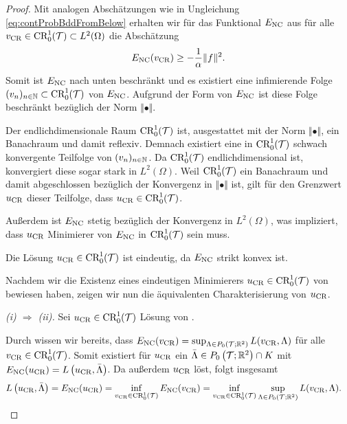 \begin{proof} 
  Mit analogen Abschätzungen wie in Ungleichung \eqref{eq:contProbBddFromBelow}
  erhalten wir für das Funktional $E_\textup{NC}$ aus  
  für alle $v_\textup{CR}\in\textup{CR}^1_0(\mathcal{T})\subset L^2(\Omega)$ die Abschätzung 
  \begin{equation*}
    E_\textup{NC}(v_\textup{CR}) \geq -\frac{1}{\alpha}\Vert f\Vert^2.
  \end{equation*}
  Somit ist $E_\textup{NC}$ nach unten beschränkt und es existiert eine infimierende
  Folge $(v_n)_{n\in\mathbb{N}} \subset \textup{CR}^1_0(\mathcal{T})$ von $E_\textup{NC}$. 
  Aufgrund der Form von $E_\textup{NC}$ ist diese Folge beschränkt bezüglich der Norm
  $\Vert\bullet\Vert$. 

  Der endlichdimensionale Raum $\textup{CR}^1_0(\mathcal{T})$ ist, ausgestattet mit der Norm
  $\Vert\bullet\Vert$, ein Banachraum und damit reflexiv. 
  Demnach existiert eine in $\textup{CR}^1_0(\mathcal{T})$ schwach konvergente Teilfolge von
  $(v_n)_{n\in\mathbb{N}}$.
  Da $\textup{CR}^1_0(\mathcal{T})$ endlichdimensional ist, konvergiert diese sogar stark
  in $L^2(\Omega)$. 
  Weil $\textup{CR}^1_0(\mathcal{T})$ ein Banachraum und damit abgeschlossen bezüglich der
  Konvergenz in $\Vert\bullet\Vert$ ist, gilt für den Grenzwert $u_\textup{CR}$ dieser
  Teilfolge, dass $u_\textup{CR}\in\textup{CR}^1_0(\mathcal{T})$.

  Außerdem ist $E_\textup{NC}$ stetig bezüglich der Konvergenz in $L^2(\Omega)$,
  was impliziert, dass $u_\textup{CR}$ Minimierer von $E_\textup{NC}$ in $\textup{CR}^1_0(\mathcal{T})$ sein
  muss. 

  Die Lösung $u_\textup{CR}\in \textup{CR}^1_0(\mathcal{T})$ ist eindeutig, da $E_\textup{NC}$ strikt konvex
  ist.

  Nachdem wir die Existenz eines eindeutigen Minimierers
  $u_\textup{CR}\in\textup{CR}^1_0(\mathcal{T})$ von  bewiesen haben,
  zeigen wir nun die äquivalenten Charakterisierung von $u_\textup{CR}$.

  \textit{(i) $\Rightarrow$ (ii).}
  Sei $u_\textup{CR}\in\textup{CR}^1_0(\mathcal{T})$ Lösung von .

  Durch  wissen wir bereits,
  dass $E_\textup{NC}(v_\textup{CR}) = \sup_{\Lambda\in
  P_0\left(\mathcal{T};\mathbb{R}^2\right)}L(v_\textup{CR},\Lambda)$ für alle
  $v_\textup{CR}\in\textup{CR}^1_0(\mathcal{T})$.
  Somit existiert für $u_\textup{CR}$ ein $\bar\Lambda\in
  P_0\left(\mathcal{T};\mathbb{R}^2\right)\cap K$ mit $E_\textup{NC}(u_\textup{CR}) =
  L\left(u_\textup{CR},\bar\Lambda\right)$. 
  Da außerdem $u_\textup{CR}$  löst, folgt insgesamt
  \begin{align}
    \label{eq:lagrangianEqualsInfSup}
    L\left(u_\textup{CR},\bar\Lambda\right)
    &=
    E_\textup{NC}(u_\textup{CR})
    =
    \inf_{v_\textup{CR}\in\textup{CR}^1_0(\mathcal{T})}E_\textup{NC}(v_\textup{CR})
    =
    \inf_{v_\textup{CR}\in\textup{CR}^1_0(\mathcal{T})}\sup_{\Lambda\in P_0\left(\mathcal{T};\mathbb{R}^2\right)} 
    L(v_\textup{CR},\Lambda).
  \end{align}


\end{proof}
